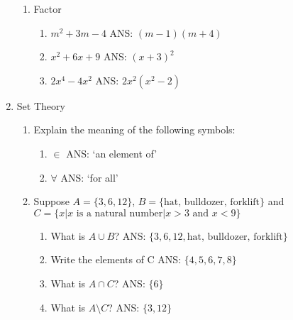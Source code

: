 \documentclass[11pt]{article}
\begin{document}
\begin{enumerate}
\begin{enumerate}
\item Factor
\begin{enumerate}
\item $m^2+3m-4 $ \color{gray} ANS: $(m-1)(m+4)$\color{black} \\
\item $x^2+6x+9$ \color{gray} ANS: $(x+3)^2$ \color{black} \\
\item $2x^4-4x^2$ \color{gray} ANS: $2x^2(x^2-2) $ \color{black} \\
\end{enumerate}

\end{enumerate}

\item Set Theory
\begin{enumerate}
\item Explain the meaning of the following symbols:
\begin{enumerate}
\item $\in$ \color{gray} ANS: `an element of' \color{black} \\
\item $\forall$ \color{gray} ANS: `for all'  \color{black} \\
\end{enumerate}
\item Suppose $A=\{3, 6, 12\}$,  $B=\{\text{hat, bulldozer, forklift}\}$ and $C=\{x| x\text{ is a natural number}| x >3 \text{ and } x<9\}$
\begin{enumerate}
\item What is $A \cup B$? \color{gray} ANS: $\{ 3, 6, 12,  \text{hat, bulldozer, forklift}\}$\color{black} \\
\item Write the elements of C \color{gray} ANS: $\{ 4,5,6,7,8\} $ \color{black} \\
\item What is $A \cap C$? \color{gray} ANS: $\{6\}$ \color{black} \\
\item What is $A\setminus C$? \color{gray} ANS: $\{3,12\}$ \color{black} \\
\end{enumerate}
\end{enumerate}




\end{enumerate}
\end{document}
